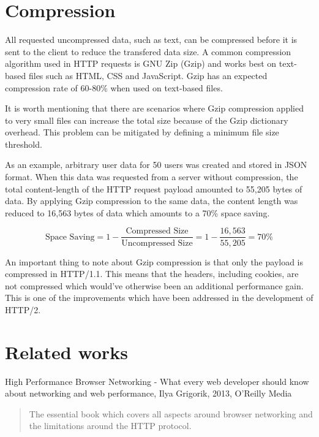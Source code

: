 \documentclass{cslthse-msc}
\begin{document}
\section{Compression}
\label{compression}

All requested uncompressed data, such as text, can be compressed before it is sent to the client to reduce the transfered data size. A common compression algorithm used in HTTP requests is GNU Zip (Gzip) and works best on text-based files such as HTML, CSS and JavaScript. Gzip has an expected compression rate of 60-80\% when used on text-based files\cite[page 237]{HPBN}.

It is worth mentioning that there are scenarios where Gzip compression applied to very small files can increase the total size because of the Gzip dictionary overhead. This problem can be mitigated by defining a minimum file size threshold\cite{google_gzip}.

As an example, arbitrary user data for 50 users was created and stored in JSON format. When this data was requested from a server without compression, the total content-length of the HTTP request payload amounted to 55,205 bytes of data. By applying Gzip compression to the same data, the content length was reduced to 16,563 bytes of data which amounts to a 70\% space saving. 

\begin{equation}
\mbox{Space Saving} = 1 - \frac{\mbox{Compressed Size}}{\mbox{Uncompressed Size}} = 1 - \frac{16,563}{55,205} = 70\%
\end{equation}

An important thing to note about Gzip compression is that only the payload is compressed in HTTP/1.1\cite{header_compression}. This means that the headers, including cookies, are not compressed which would've otherwise been an additional performance gain. This is one of the improvements which have been addressed in the development of HTTP/2\cite[page 222]{HPBN}.

\section{Related works}
High Performance Browser Networking - What every web developer should know about networking and web performance, Ilya Grigorik, 2013, O'Reilly Media

\begin{quote}
	The essential book which covers all aspects around browser networking and the limitations around the HTTP protocol.
\end{quote}
\end{document}
